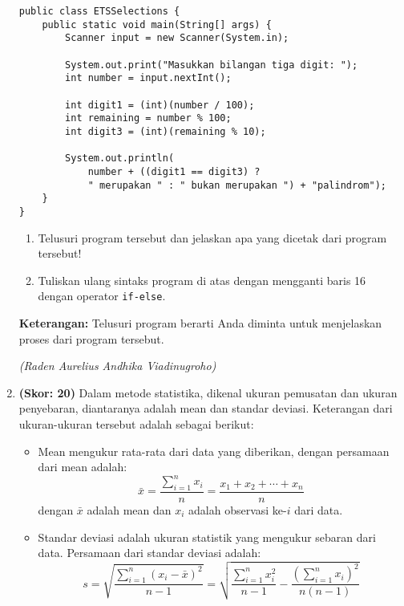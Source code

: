 \documentclass{article}
\begin{document}
\begin{enumerate}
\begin{verbatim}
public class ETSSelections {
    public static void main(String[] args) {
        Scanner input = new Scanner(System.in);
    
        System.out.print("Masukkan bilangan tiga digit: ");
        int number = input.nextInt();
    
        int digit1 = (int)(number / 100);
        int remaining = number % 100;
        int digit3 = (int)(remaining % 10);
    
        System.out.println(
            number + ((digit1 == digit3) ? 
            " merupakan " : " bukan merupakan ") + "palindrom");
    }
}

    \end{verbatim}
    \begin{enumerate}
        \item Telusuri program tersebut dan jelaskan apa yang dicetak dari program tersebut!
        \item Tuliskan ulang sintaks program di atas dengan mengganti baris 16 dengan operator \texttt{if-else}.
    \end{enumerate}

    \textbf{Keterangan:} Telusuri program berarti Anda diminta untuk menjelaskan proses dari program tersebut.
    
    \begin{flushright}
    \textit{(Raden Aurelius Andhika Viadinugroho)}
    \end{flushright}
    
    \item \textbf{(Skor: 20)} Dalam metode statistika, dikenal ukuran pemusatan dan ukuran penyebaran, diantaranya adalah mean dan standar deviasi. Keterangan dari ukuran-ukuran tersebut adalah sebagai berikut:
    
    \begin{itemize}
        \item Mean mengukur rata-rata dari data yang diberikan, dengan persamaan dari mean adalah:
        \[
        \bar{x} = \frac{\sum_{i=1}^{n} x_i}{n} = \frac{x_1 + x_2 + \cdots + x_n}{n}
        \]
        dengan $\bar{x}$ adalah mean dan $x_i$ adalah observasi ke-$i$ dari data.
        
        \item Standar deviasi adalah ukuran statistik yang mengukur sebaran dari data. Persamaan dari standar deviasi adalah:
        \[
        s = \sqrt{\frac{\sum_{i=1}^{n} (x_i - \bar{x})^2}{n - 1}} = \sqrt{\frac{\sum_{i=1}^{n} x_i^2}{n - 1} - \frac{\left( \sum_{i=1}^{n} x_i \right)^2}{n(n-1)}}
        \]
    \end{itemize}
    

\end{enumerate}
\end{document}

